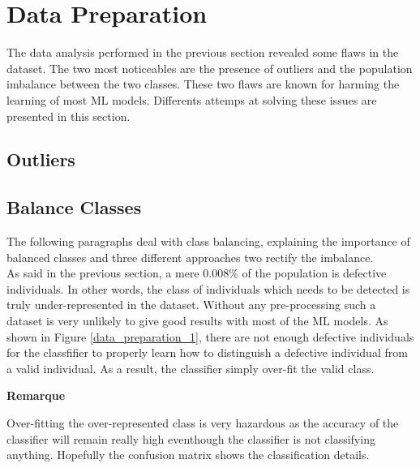 \section{Data Preparation}
The data analysis performed in the previous section revealed some flaws in the dataset. The two most noticeables are the presence of outliers and the population imbalance between the two classes. These two flaws are known for harming the learning of most ML models. Differents attemps at solving these issues are presented in this section.

\subsection{Outliers}

\subsection{Balance Classes}
\label{balance_classes}
The following paragraphs deal with class balancing, explaining the importance of balanced classes and three different approaches two rectify the imbalance.\\

As said in the previous section, a mere 0.008\% of the population is defective individuals. In other words, the class of individuals which needs to be detected is truly under-represented in the dataset.
Without any pre-processing such a dataset is very unlikely to give good results with most of the ML models. As shown in Figure \ref{data_preparation_1}, there are not enough defective individuals for the classfifier to properly learn how to distinguish a defective individual from a valid individual. As a result, the classifier simply over-fit the valid class.\\

\noindent
\begin{minipage}[!hc]{0.12\textwidth}
   \textbf{Remarque}
\end{minipage}
\vrule\enskip\vrule\quad\begin{minipage}{\dimexpr 0.87\textwidth-0.8pt-1.5em}
Over-fitting the over-represented class is very hazardous as the accuracy of the classifier will remain really high eventhough the classifier is not classifying anything. Hopefully the confusion matrix shows the classification details.
\end{minipage}\\

